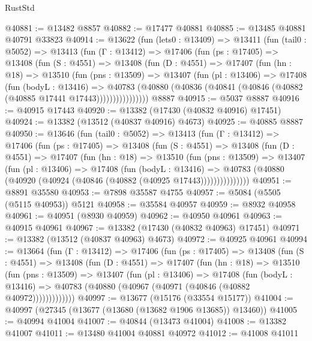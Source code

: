 \begin{lexlean}{RustStd}
\begin{coremodule}
@40881 := @13482 @8857
@40882 := @17477 @40881
@40885 := @13485 @40881 @40791 @33823
@40914 := @13622
    (fun (lets0 : @13409) =>
    @13411
      (fun (tail0 : @5052) =>
      @13413
        (fun (Γ : @13412) =>
        @17406
          (fun (ps : @17405) =>
          @13408
            (fun (S : @4551) =>
            @13408
              (fun (D : @4551) =>
              @17407
                (fun (hn : @18) =>
                @13510
                  (fun (pns : @13509) =>
                  @13407
                    (fun (pl : @13406) =>
                    @17408
                      (fun (bodyL : @13416) =>
                      @40783
                        (@40880
                          (@40836 (@40841 (@40846 (@40882 (@40885 @17441 @17443))))))))))))))))
    @8887
@40915 := @5037 @8887
@40916 := @40915 @17443
@40920 := @13382 (@17430 (@40832 @40916) @17451)
@40924 := @13382 (@13512 (@40837 @40916) @4673)
@40925 := @40885 @8887
@40950 := @13646
    (fun (tail0 : @5052) =>
    @13413
      (fun (Γ : @13412) =>
      @17406
        (fun (ps : @17405) =>
        @13408
          (fun (S : @4551) =>
          @13408
            (fun (D : @4551) =>
            @17407
              (fun (hn : @18) =>
              @13510
                (fun (pns : @13509) =>
                @13407
                  (fun (pl : @13406) =>
                  @17408
                    (fun (bodyL : @13416) =>
                    @40783 (@40880 (@40920 (@40924 (@40846 (@40882 (@40925 @17443)))))))))))))))
@40951 := @8891 @35580
@40953 := @7898 @35587 @4755
@40957 := @5084 (@5505 (@5115 @40953)) @5121
@40958 := @35584 @40957
@40959 := @8932 @40958
@40961 := @40951 (@8930 @40959)
@40962 := @40950 @40961
@40963 := @40915 @40961
@40967 := @13382 (@17430 (@40832 @40963) @17451)
@40971 := @13382 (@13512 (@40837 @40963) @4673)
@40972 := @40925 @40961
@40994 := @13664
    (fun (Γ : @13412) =>
    @17406
      (fun (ps : @17405) =>
      @13408
        (fun (S : @4551) =>
        @13408
          (fun (D : @4551) =>
          @17407
            (fun (hn : @18) =>
            @13510
              (fun (pns : @13509) =>
              @13407
                (fun (pl : @13406) =>
                @17408
                  (fun (bodyL : @13416) =>
                  @40783 (@40880 (@40967 (@40971 (@40846 (@40882 @40972)))))))))))))
@40997 := @13677 (@15176 (@33554 @15177))
@41004 := @40997 (@27345 (@13677 (@13680 (@13682 @1906 @13685)) @13460))
@41005 := @40994 @41004
@41007 := @40844 (@13473 @41004)
@41008 := @13382 @41007
@41011 := @13480 @41004 @40881 @40972
@41012 := @41008 @41011

\end{coremodule}
\end{lexlean}
